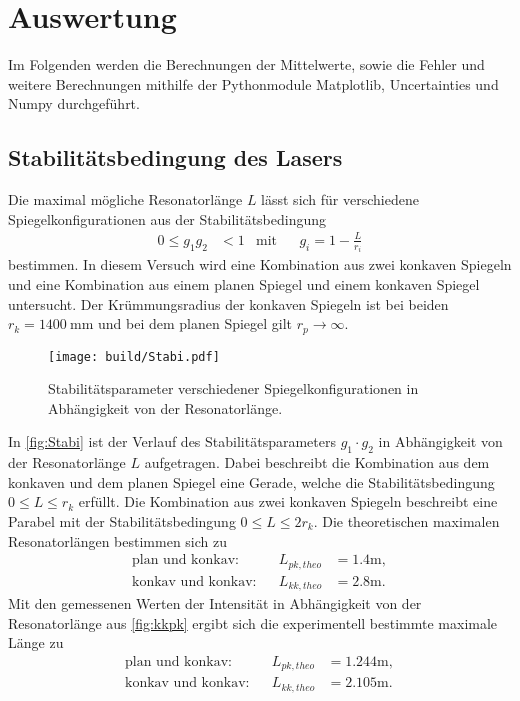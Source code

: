 \section{Auswertung}
\label{sec:Auswertung}

Im Folgenden werden die Berechnungen der Mittelwerte, sowie die Fehler und weitere Berechnungen mithilfe der Pythonmodule Matplotlib\cite{matplotlib},
Uncertainties\cite{uncertainties} und Numpy\cite{numpy} durchgeführt.

\subsection{Stabilitätsbedingung des Lasers}
\label{subsec:Stabilitätsbedingung}
Die maximal mögliche Resonatorlänge $L$ lässt sich für verschiedene Spiegelkonfigurationen aus der Stabilitätsbedingung
\begin{align*}
  0 \leq g_1 g_2 &< 1 & \text{mit}& & g_i = 1 - \frac{L}{r_i}
\end{align*}
bestimmen. In diesem Versuch wird eine Kombination aus zwei konkaven Spiegeln und eine Kombination aus einem planen Spiegel und einem konkaven
Spiegel untersucht.
Der Krümmungsradius der konkaven Spiegeln ist bei beiden $r_k = \qty{1400}{\milli\meter}$ und bei dem planen Spiegel gilt $r_p \to \infty$.

\begin{figure}[H]
  \centering
  \texttt{[image: build/Stabi.pdf]}
  \caption {Stabilitätsparameter verschiedener Spiegelkonfigurationen in Abhängigkeit von der Resonatorlänge.}
  \label{fig:Stabi}
\end{figure}

In \autoref{fig:Stabi} ist der Verlauf des Stabilitätsparameters $g_1 \cdot g_2$ in Abhängigkeit von der Resonatorlänge $L$ aufgetragen. Dabei beschreibt die
Kombination aus dem konkaven und dem planen Spiegel eine Gerade, welche die Stabilitätsbedingung $0 \leq L \leq r_k$ erfüllt. Die Kombination aus zwei konkaven Spiegeln
beschreibt eine Parabel mit der Stabilitätsbedingung $0 \leq L \leq 2 r_k$.
Die theoretischen maximalen Resonatorlängen bestimmen sich zu
\begin{align*}
  \text{plan und konkav:} && L_{pk,theo} &= 1.4 \si{\meter},\\
  \text{konkav und konkav:}&& L_{kk,theo} & = 2.8 \si{\meter}.
  \label{eqn:Länge_theo}
\end{align*}
Mit den gemessenen Werten der Intensität in Abhängigkeit von der Resonatorlänge aus \autoref{fig:kkpk} ergibt sich die experimentell
bestimmte maximale Länge zu
\begin{align}
  \text{plan und konkav:} && L_{pk,theo} &= 1.244 \si{\meter},\\
  \text{konkav und konkav:}&& L_{kk,theo} & = 2.105 \si{\meter}.
  \label{eqn:Länge_gem}
\end{align}


